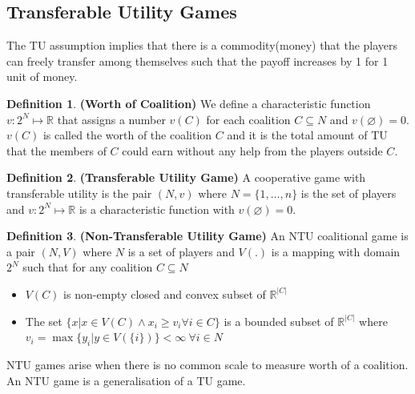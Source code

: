 \documentclass{article}
\theoremstyle{definition}
\newtheorem{defn}{Definition}[section]
\begin{document}
\subsection{Transferable Utility Games}
The TU assumption implies that there is a commodity(money) that the players can freely transfer among themselves such that the payoff increases by 1 for 1 unit of money.
\begin{defn}
\textbf{(Worth of Coalition)} We define a characteristic function $v:2^N \mapsto \mathbb{R}$ that assigns a number $v(C)$ for each coalition $C\subseteq N$ and  $v(\varnothing) = 0$. $v(C)$ is called the worth of the coalition $C$ and it is the total amount of TU that the members of $C$ could earn without any help from the players outside $C$.
\end{defn}
\begin{defn}
\textbf{(Transferable Utility Game)} A cooperative game with transferable utility is the pair $(N,v)$ where $N=\{1,\dots,n\}$ is the set of players and $v:2^N \mapsto \mathbb{R}$ is a characteristic function with $v(\varnothing) = 0$.
\end{defn}
\begin{defn}
\textbf{(Non-Transferable Utility Game)} An NTU coalitional game is a pair $(N,V)$ where $N$ is a set of players and $V(.)$ is a mapping with domain $2^N$ such that for any coalition $C\subseteq N$
\begin{itemize}
	\item $V(C)$ is non-empty closed and convex subset of $\mathbb{R}^{|C|}$
	\item The set $\{x| x\in V(C) \land x_i\geq v_i \forall i \in C\}$ is a bounded subset of $\mathbb{R}^{|C|}$ where $v_i = \max\{y_i|y \in V(\{i\})\}<\infty~\forall i \in N$
\end{itemize}
\end{defn}
NTU games arise when there is no common scale to measure worth of a coalition. An NTU game is a generalisation of a TU game.
\end{document}
